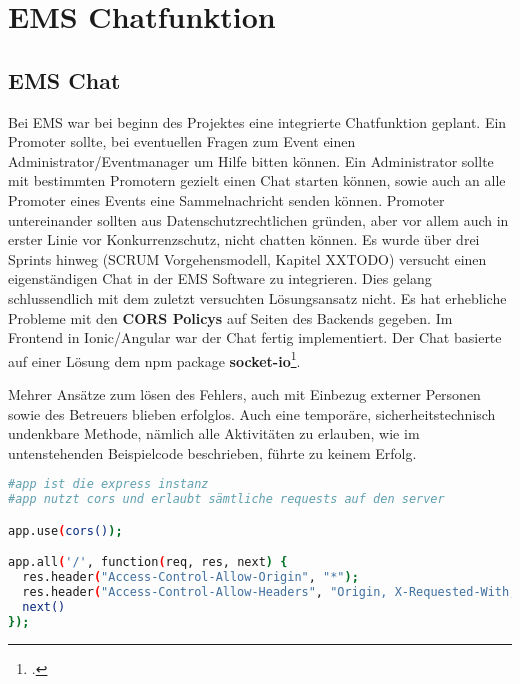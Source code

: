 \chapter{EMS Chatfunktion}
\putz

\section{EMS Chat}
Bei EMS war bei beginn des Projektes eine integrierte Chatfunktion geplant. Ein Promoter sollte, bei eventuellen Fragen zum Event einen Administrator/Eventmanager um Hilfe bitten können. Ein Administrator sollte mit bestimmten
Promotern gezielt einen Chat starten können, sowie auch an alle Promoter eines Events eine Sammelnachricht senden können. Promoter untereinander sollten aus Datenschutzrechtlichen gründen, aber vor allem auch in erster
Linie vor Konkurrenzschutz, nicht chatten können.
Es wurde über drei Sprints hinweg (SCRUM Vorgehensmodell, Kapitel XXTODO) versucht einen eigenständigen Chat in der EMS Software zu integrieren. Dies gelang schlussendlich mit dem zuletzt versuchten Lösungsansatz nicht.
Es hat erhebliche Probleme mit den \textbf{CORS Policys} auf Seiten des Backends gegeben. Im Frontend in Ionic/Angular war der Chat fertig implementiert. Der Chat basierte auf einer Lösung dem npm package \textbf{socket-io}\footcite{socket-io}.


Mehrer Ansätze zum lösen des Fehlers, auch mit Einbezug externer Personen sowie des Betreuers blieben erfolglos. Auch eine temporäre, sicherheitstechnisch undenkbare Methode, nämlich alle Aktivitäten zu erlauben, wie im untenstehenden Beispielcode beschrieben, führte zu keinem Erfolg.

\begin{lstlisting}[language=bash]
#app ist die express instanz
#app nutzt cors und erlaubt sämtliche requests auf den server 

app.use(cors());

app.all('/', function(req, res, next) {
  res.header("Access-Control-Allow-Origin", "*");
  res.header("Access-Control-Allow-Headers", "Origin, X-Requested-With, Content-Type, Accept");
  next()
});
\end{lstlisting}

